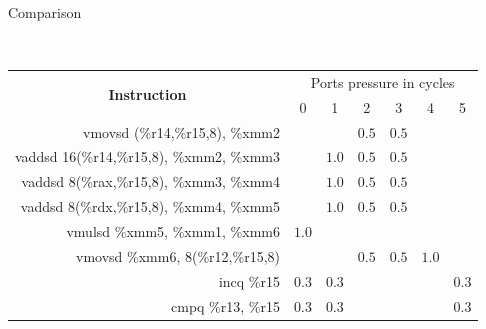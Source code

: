 \documentclass[10pt, tikz,border=2mm, xcolor=dvipsnames]{beamer}
\begin{document}
\begin{frame}[fragile]{Comparison}
\begin{mdframed}[backgroundcolor=light-gray, roundcorner=10pt,leftmargin=1, rightmargin=1, innerleftmargin=15, innertopmargin=5,innerbottommargin=5, outerlinewidth=1, linecolor=light-gray]
    \begin{minipage}{0.05\textwidth}
         \vspace{55pt} \\
    \end{minipage}
    \begin{minipage}{0.9\textwidth}
    \centering
     \begin{adjustbox}{height=0.2\textheight,width=0.95\textwidth} \begin{tabular}
            {|r|c|c|c|c|c|c|}
            \hline
            \multicolumn{1}{|c|}{\multirow{2}{*}{\textbf{Instruction}}} & \multicolumn{6}{|c|}{Ports pressure in cycles}\\
            \cline{2-7}
            & 0 & 1 & 2 & 3 & 4 & 5 \\ \cline{1-7}
            vmovsd  (\%r14,\%r15,8), \%xmm2           &       &       & $0.5$ & $0.5$ &       &       \\
            vaddsd  16(\%r14,\%r15,8), \%xmm2, \%xmm3 &       & $1.0$ & $0.5$ & $0.5$ &       &       \\
            vaddsd  8(\%rax,\%r15,8), \%xmm3, \%xmm4  &       & $1.0$ & $0.5$ & $0.5$ &       &       \\
            vaddsd  8(\%rdx,\%r15,8), \%xmm4, \%xmm5  &       & $1.0$ & $0.5$ & $0.5$ &       &       \\
            vmulsd  \%xmm5, \%xmm1, \%xmm6            & $1.0$ &       &       &       &       &       \\
            vmovsd  \%xmm6, 8(\%r12,\%r15,8)          &       &       & $0.5$ & $0.5$ & $1.0$ &       \\
            incq    \%r15                             & $0.3$ & $0.3$ &       &       &       & $0.3$ \\
            cmpq    \%r13, \%r15                      & $0.3$ & $0.3$ &       &       &       & $0.3$ \\

\end{tabular}
\end{adjustbox}
\end{minipage}
\end{mdframed}
\end{frame}
\end{document}
